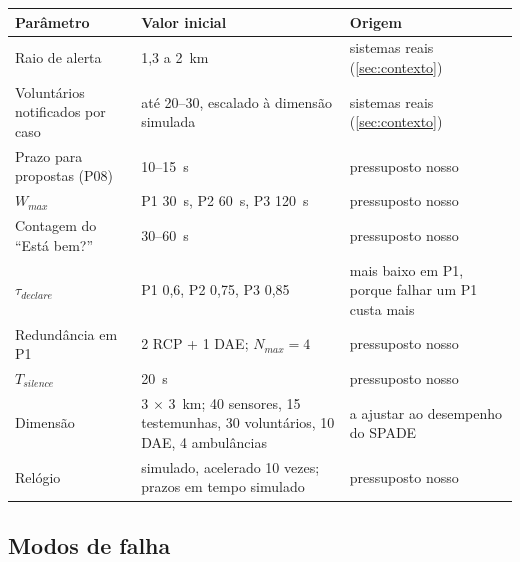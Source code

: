 \documentclass[10pt,a4paper]{article}
\begin{document}
{\small
\begin{xltabular}{\linewidth}{@{}P{4.2cm}LP{4.2cm}@{}}
\toprule
Parâmetro & Valor inicial & Origem \\
\midrule
\endhead
Raio de alerta & 1,3 a 2~km & sistemas reais (\ref{sec:contexto}) \\
Voluntários notificados por caso & até 20--30, escalado à dimensão simulada & sistemas reais (\ref{sec:contexto}) \\
Prazo para propostas (P08) & 10--15~s & pressuposto nosso \\
$W_{max}$ & P1 30~s, P2 60~s, P3 120~s & pressuposto nosso \\
Contagem do ``Está bem?'' & 30--60~s & pressuposto nosso \\
$\tau_{declare}$ & P1 0,6, P2 0,75, P3 0,85 & mais baixo em P1, porque falhar um P1 custa mais \\
Redundância em P1 & 2 RCP + 1 DAE; $N_{max} = 4$ & pressuposto nosso \\
$T_{silence}$ & 20~s & pressuposto nosso \\
Dimensão & 3 $\times$ 3~km; 40 sensores, 15 testemunhas, 30 voluntários, 10 DAE, 4 ambulâncias & a ajustar ao desempenho do SPADE \\
Relógio & simulado, acelerado 10 vezes; prazos em tempo simulado & pressuposto nosso \\
\bottomrule
\end{xltabular}
}

\subsection{Modos de falha}\label{sec:falhas}
\end{document}
